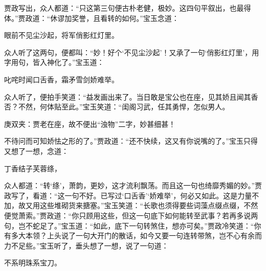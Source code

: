 \begin{parag}
    贾政写出，众人都道：“只这第三句便古朴老健，极妙。这四句平叙出，也最得体。”贾政道：“休谬加奖誉，且看转的如何。”宝玉念道：
\end{parag}


\begin{poem}
    \begin{pl}眼前不见尘沙起，将军俏影红灯里。\end{pl}

\end{poem}


\begin{parag}
    众人听了这两句，便都叫：“妙！好个‘不见尘沙起’！又承了一句‘俏影红灯里’，用字用句，皆入神化了。”宝玉道：
\end{parag}


\begin{poem}
    \begin{pl}叱咤时闻口舌香，霜矛雪剑娇难举。\end{pl}
\end{poem}


\begin{parag}
    众人听了，便拍手笑道：“益发画出来了。当日敢是宝公也在座，见其娇且闻其香否？不然，何体贴至此。”宝玉笑道：“闺阁习武，任其勇悍，怎似男人。\begin{note}庚双夹：贾老在座，故不便出“浊物”二字，妙甚细甚！\end{note}不待问而可知娇怯之形的了。”贾政道：“还不快续，这又有你说嘴的了。”宝玉只得又想了一想，念道：
\end{parag}


\begin{poem}
    \begin{pl}丁香结子芙蓉绦，\end{pl}
\end{poem}


\begin{parag}
    众人都道：“转‘绦’，萧韵，更妙，这才流利飘荡。而且这一句也绮靡秀媚的妙。”贾政写了，看道：“这一句不好。已写过‘口舌香’‘娇难举’，何必又如此。这是力量不加，故又用这些堆砌货来搪塞。”宝玉笑道：“长歌也须得要些词藻点缀点缀，不然便觉萧索。”贾政道：“你只顾用这些，但这一句底下如何能转至武事？若再多说两句，岂不蛇足了。”宝玉道：“如此，底下一句转煞住，想亦可矣。”贾政冷笑道：“你有多大本领？上头说了一句大开门的散话，如今又要一句连转带煞，岂不心有余而力不足些。”宝玉听了，垂头想了一想，说了一句道：
\end{parag}


\begin{poem}
    \begin{pl}不系明珠系宝刀。\end{pl}
\end{poem}


